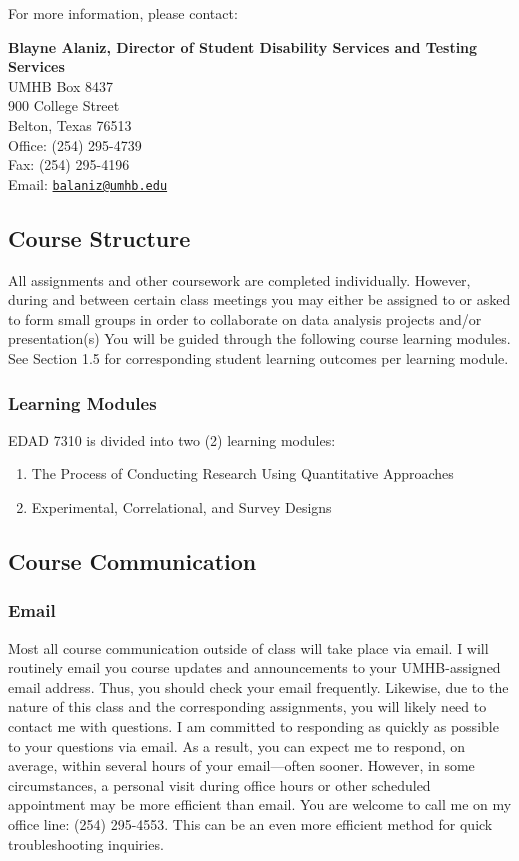 \documentclass[
]{article}
\providecommand{\tightlist}{%
  \setlength{\itemsep}{0pt}\setlength{\parskip}{0pt}}
\begin{document}
For more information, please contact:

\textbf{Blayne Alaniz, Director of Student Disability Services and
Testing Services}\\
UMHB Box 8437\\
900 College Street\\
Belton, Texas 76513\\
Office: (254) 295-4739\\
Fax: (254) 295-4196\\
Email: \texttt{\href{mailto:balaniz@umhb.edu}{balaniz@umhb.edu}}

\subsection{Course Structure}

All assignments and other coursework are completed individually.
However, during and between certain class meetings you may either be
assigned to or asked to form small groups in order to collaborate on
data analysis projects and/or presentation(s) You will be guided through
the following course learning modules. See Section 1.5 for corresponding
student learning outcomes per learning module.

\subsubsection{Learning Modules}

EDAD 7310 is divided into two (2) learning modules:

\begin{enumerate}
\def\labelenumi{\arabic{enumi}.}
\tightlist
\item
  The Process of Conducting Research Using Quantitative Approaches
\item
  Experimental, Correlational, and Survey Designs
\end{enumerate}

\subsection{Course Communication}

\subsubsection{Email}

Most all course communication outside of class will take place via
email. I will routinely email you course updates and announcements to
your UMHB-assigned email address. Thus, you should check your email
frequently. Likewise, due to the nature of this class and the
corresponding assignments, you will likely need to contact me with
questions. I am committed to responding as quickly as possible to your
questions via email. As a result, you can expect me to respond, on
average, within several hours of your email---often sooner. However, in
some circumstances, a personal visit during office hours or other
scheduled appointment may be more efficient than email. You are welcome
to call me on my office line: (254) 295-4553. This can be an even more
efficient method for quick troubleshooting inquiries.
\end{document}
